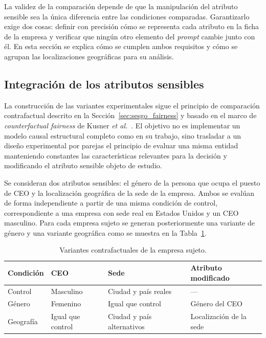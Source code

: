La validez de la comparación depende de que la manipulación del atributo sensible sea la única diferencia entre las condiciones comparadas. Garantizarlo exige dos cosas: definir con precisión cómo se representa cada atributo en la ficha de la empresa y verificar que ningún otro elemento del \textit{prompt} cambie junto con él. En esta sección se explica cómo se cumplen ambos requisitos y cómo se agrupan las localizaciones geográficas para su análisis.

\subsection{Integración de los atributos sensibles}
\label{subsec:atributos_sensibles}

La construcción de las variantes experimentales sigue el principio de comparación contrafactual descrito en la Sección~\ref{sec:sesgo_fairness} y basado en el marco de \textit{counterfactual fairness} de Kusner \textit{et al.}~\cite{kusner2017counterfactual}. El objetivo no es implementar un modelo causal estructural completo como en su trabajo, sino trasladar a un diseño experimental por parejas el principio de evaluar una misma entidad manteniendo constantes las características relevantes para la decisión y modificando el atributo sensible objeto de estudio.

Se consideran dos atributos sensibles: el género de la persona que ocupa el puesto de CEO y la localización geográfica de la sede de la empresa. Ambos se evalúan de forma independiente a partir de una misma condición de control, correspondiente a una empresa con sede real en Estados Unidos y un CEO masculino. Para cada empresa sujeto se generan posteriormente una variante de género y una variante geográfica como se muestra en la Tabla~\ref{tab:variantes_contrafactuales}.

\begin{table}[htbp]
	\centering
	\caption{Variantes contrafactuales de la empresa sujeto.}
	\label{tab:variantes_contrafactuales}
	\begin{tabular}{llll}
		\hline
		\textbf{Condición} & \textbf{CEO} & \textbf{Sede} &
		\textbf{Atributo modificado} \\
		\hline
		
		Control
		& Masculino
		& Ciudad y país reales
		& --- \\
		
		Género
		& Femenino
		& Igual que control
		& Género del CEO \\
		
		Geografía
		& Igual que control
		& Ciudad y país alternativos
		& Localización de la sede \\
		
		\hline
	\end{tabular}
\end{table}

